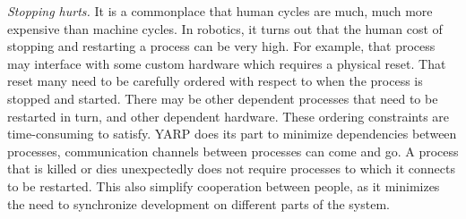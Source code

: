 \emph {Stopping hurts.}
It is a commonplace that human cycles are much, much more expensive
than machine cycles.  In robotics, it turns out that the human
cost of stopping and restarting a process can be very high.
For example, that process may interface with some
custom hardware which requires a physical reset.  
That reset many need to be carefully ordered with respect to when the
process is stopped and started.
%
There may be other dependent processes that need to be restarted in
turn, and other dependent hardware. 
%
%
%
These ordering constraints are time-consuming to satisfy.
%
YARP does its part to minimize dependencies between processes,
communication channels between processes can come and go. 
A process that is killed or dies
unexpectedly does not require processes to which it connects to be
restarted. This also simplify cooperation between people, as
it minimizes the need to synchronize development on different  
parts of the system.
%
%

